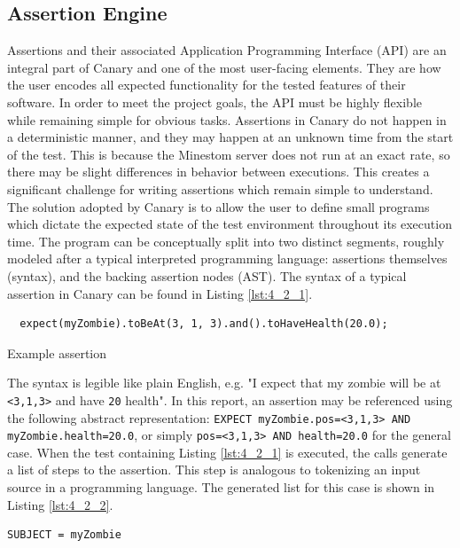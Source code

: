\documentclass[12pt]{article}
\def\code#1{\texttt{#1}}
\begin{document}
\begin{onehalfspacing}
\subsection{Assertion Engine}

Assertions and their associated Application Programming Interface (API)
are an integral part of Canary and one of the most user-facing elements.
They are how the user encodes all expected functionality for the tested
features of their software. In order to meet the project goals, the API
must be highly flexible while remaining simple for obvious tasks.
Assertions in Canary do not happen in a deterministic manner, and they
may happen at an unknown time from the start of the test. This is
because the Minestom server does not run at an exact rate, so there may
be slight differences in behavior between executions. This creates a
significant challenge for writing assertions which remain simple to
understand. The solution adopted by Canary is to allow the user to
define small programs which dictate the expected state of the test
environment throughout its execution time. The program can be
conceptually split into two distinct segments, roughly modeled after a
typical interpreted programming language: assertions themselves
(syntax), and the backing assertion nodes (AST). The syntax of a typical
assertion in Canary can be found in Listing \ref{lst:4_2_1}.

\begin{listing}[H]
\begin{verbatim}
  expect(myZombie).toBeAt(3, 1, 3).and().toHaveHealth(20.0);
\end{verbatim}
\caption{Example assertion}
\label{lst:4_2_1}
\end{listing}

The syntax is legible like plain English, e.g. "I expect that my zombie
will be at \code{\textless3,1,3\textgreater{}} and have \code{20} health". In this
report, an assertion may be referenced using the following abstract
representation: \code{EXPECT myZombie.pos=\textless3,1,3\textgreater{} AND
myZombie.health=20.0}, or simply \code{pos=\textless3,1,3\textgreater{} AND
health=20.0} for the general case. When the test containing Listing \ref{lst:4_2_1}
is executed, the calls generate a list of steps to the assertion. This
step is analogous to tokenizing an input source in a programming
language. The generated list for this case is shown in Listing \ref{lst:4_2_2}.

\begin{listing}[H]
\begin{verbatim}
SUBJECT = myZombie


\end{verbatim}
\end{listing}
\end{onehalfspacing}
\end{document}
